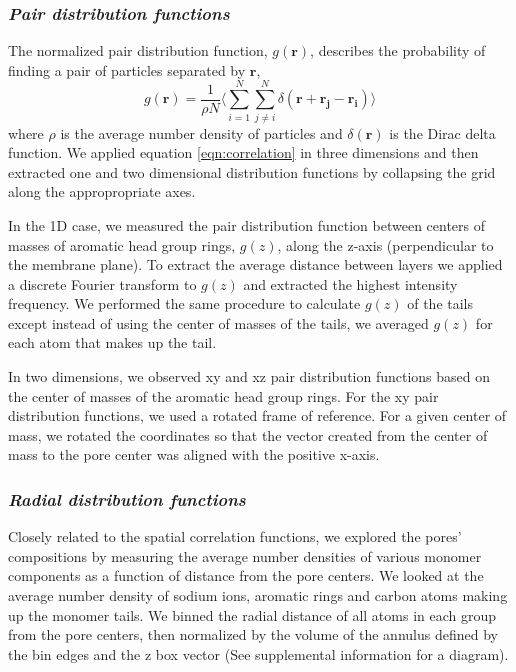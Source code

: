 \documentclass[journal=jpcbfk,manusciprt=article]{achemso}
\begin{document}
  \subsubsection{\textit{Pair distribution functions}}

  The normalized pair distribution function, $g(\mathbf{r})$, describes
  the probability of finding a pair of particles separated by $\mathbf{r}$,
  \begin{equation}
	g(\mathbf{r})= \frac{1}{\rho N} \Bigg \langle \sum_{i=1}^{N}\sum_{j\neq i}^{N} \delta(\mathbf{r}+\mathbf{r_j}-\mathbf{r_i}) \Bigg \rangle
	\label{eqn:correlation}
  \end{equation}
  where $\rho$ is the average number density of particles and
  $\delta(\mathbf{r})$ is the Dirac delta function\cite{kuriabova_linear_2010}.
  We applied equation \ref{eqn:correlation} in three dimensions and then
  extracted one and two dimensional distribution functions by collapsing the grid
  along the appropropriate axes.

  In the 1D case, we measured the pair distribution function between centers of
  masses of aromatic head group rings, $g(z)$, along the z-axis (perpendicular to
  the membrane plane). To extract the average distance between layers we applied
  a discrete Fourier transform to $g(z)$ and extracted the highest intensity
  frequency. We performed the same procedure to calculate $g(z)$ of the tails 
  except instead of using the center of masses of the tails, we averaged $g(z)$
  for each atom that makes up the tail.

  In two dimensions, we observed xy and xz pair distribution functions based on
  the center of masses of the aromatic head group rings. For the xy pair
  distribution functions, we used a rotated frame of reference. For a given center
  of mass, we rotated the coordinates so that the vector created from the center
  of mass to the pore center was aligned with the positive x-axis. 



  \subsubsection{\textit{Radial distribution functions}}
  Closely related to the spatial correlation functions, we explored the pores'
  compositions by measuring the average number densities of various monomer
  components as a function of distance from the pore centers. We looked at the
  average number density of sodium ions, aromatic rings and carbon atoms making
  up the monomer tails. We binned the radial distance of all atoms in each group
  from the pore centers, then normalized by the volume of the annulus defined by
  the bin edges and the z box vector (See supplemental information for a 
  diagram). 
\end{document}
